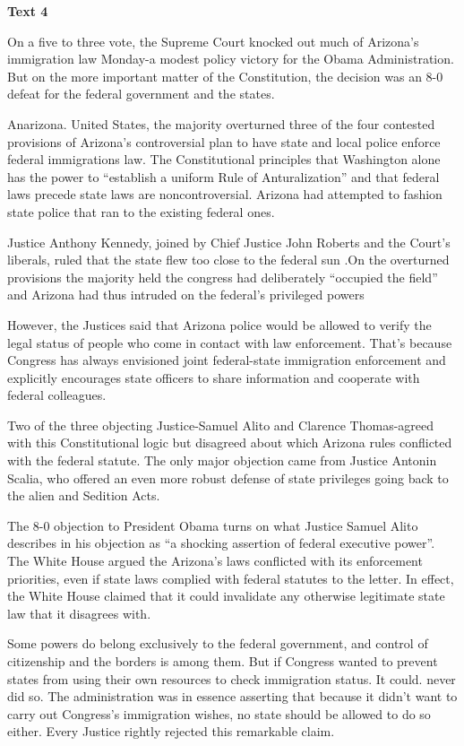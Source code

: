 \textbf{Text 4}

On a five to three vote, the Supreme Court knocked out much of Arizona's immigration law Monday-a modest policy victory for the Obama Administration. But on the more important matter of the Constitution, the decision was an 8-0 defeat for the federal government and the states.

Anarizona. United States, the majority overturned three of the four contested provisions of Arizona's controversial plan to have state and local police enforce federal immigrations law. The Constitutional principles that Washington alone has the power to ``establish a uniform Rule of Anturalization'' and that federal laws precede state laws are noncontroversial. Arizona had attempted to fashion state police that ran to the existing federal ones.

Justice Anthony Kennedy, joined by Chief Justice John Roberts and the Court's liberals, ruled that the state flew too close to the federal sun .On the overturned provisions the majority held the congress had deliberately ``occupied the field'' and Arizona had thus intruded on the federal's privileged powers

However, the Justices said that Arizona police would be allowed to verify the legal status of people who come in contact with law enforcement. That’s because Congress has always envisioned joint federal-state immigration enforcement and explicitly encourages state officers to share information and cooperate with federal colleagues.

Two of the three objecting Justice-Samuel Alito and Clarence Thomas-agreed with this Constitutional logic but disagreed about which Arizona rules conflicted with the federal statute. The only major objection came from Justice Antonin Scalia, who offered an even more robust defense of state privileges going back to the alien and Sedition Acts.

The 8-0 objection to President Obama turns on what Justice Samuel Alito describes in his objection as “a shocking assertion of federal executive power”. The White House argued the Arizona’s laws conflicted with its enforcement priorities, even if state laws complied with federal statutes to the letter. In effect, the White House claimed that it could invalidate any otherwise legitimate state law that it disagrees with.

Some powers do belong exclusively to the federal government, and control of citizenship and the borders is among them. But if Congress wanted to prevent states from using their own resources to check immigration status. It could. never did so. The administration was in essence asserting that because it didn't want to carry out Congress's immigration wishes, no state should be allowed to do so either. Every Justice rightly rejected this remarkable claim.

